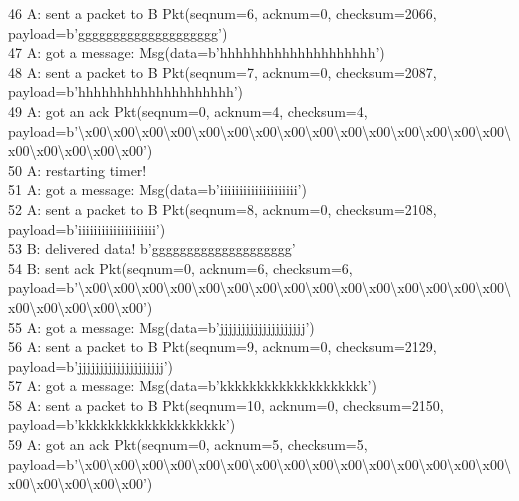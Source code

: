 \documentclass{article}
\begin{document}
{46 A: sent a packet to B Pkt(seqnum=6, acknum=0, checksum=2066,
payload=b'gggggggggggggggggggg') \\
47 A: got a message: Msg(data=b'hhhhhhhhhhhhhhhhhhhh') \\
48 A: sent a packet to B Pkt(seqnum=7, acknum=0, checksum=2087,
payload=b'hhhhhhhhhhhhhhhhhhhh') \\
49 A: got an ack Pkt(seqnum=0, acknum=4, checksum=4,
payload=b'\textbackslash{}x00\textbackslash{}x00\textbackslash{}x00\textbackslash{}x00\textbackslash{}x00\textbackslash{}x00\textbackslash{}x00\textbackslash{}x00\textbackslash{}x00\textbackslash{}x00\textbackslash{}x00\textbackslash{}x00\textbackslash{}x00\textbackslash{}x00\textbackslash{}x00\textbackslash{}x00\textbackslash{}x00\textbackslash{}x00\textbackslash{}x00\textbackslash{}x00')
\\
50 A: restarting timer! \\
51 A: got a message: Msg(data=b'iiiiiiiiiiiiiiiiiiii') \\
52 A: sent a packet to B Pkt(seqnum=8, acknum=0, checksum=2108,
payload=b'iiiiiiiiiiiiiiiiiiii') \\
53 B: delivered data! b'gggggggggggggggggggg' \\
54 B: sent ack Pkt(seqnum=0, acknum=6, checksum=6,
payload=b'\textbackslash{}x00\textbackslash{}x00\textbackslash{}x00\textbackslash{}x00\textbackslash{}x00\textbackslash{}x00\textbackslash{}x00\textbackslash{}x00\textbackslash{}x00\textbackslash{}x00\textbackslash{}x00\textbackslash{}x00\textbackslash{}x00\textbackslash{}x00\textbackslash{}x00\textbackslash{}x00\textbackslash{}x00\textbackslash{}x00\textbackslash{}x00\textbackslash{}x00')
\\
55 A: got a message: Msg(data=b'jjjjjjjjjjjjjjjjjjjj') \\
56 A: sent a packet to B Pkt(seqnum=9, acknum=0, checksum=2129,
payload=b'jjjjjjjjjjjjjjjjjjjj') \\
57 A: got a message: Msg(data=b'kkkkkkkkkkkkkkkkkkkk') \\
58 A: sent a packet to B Pkt(seqnum=10, acknum=0, checksum=2150,
payload=b'kkkkkkkkkkkkkkkkkkkk') \\
59 A: got an ack Pkt(seqnum=0, acknum=5, checksum=5,
payload=b'\textbackslash{}x00\textbackslash{}x00\textbackslash{}x00\textbackslash{}x00\textbackslash{}x00\textbackslash{}x00\textbackslash{}x00\textbackslash{}x00\textbackslash{}x00\textbackslash{}x00\textbackslash{}x00\textbackslash{}x00\textbackslash{}x00\textbackslash{}x00\textbackslash{}x00\textbackslash{}x00\textbackslash{}x00\textbackslash{}x00\textbackslash{}x00\textbackslash{}x00')
}
\end{document}

